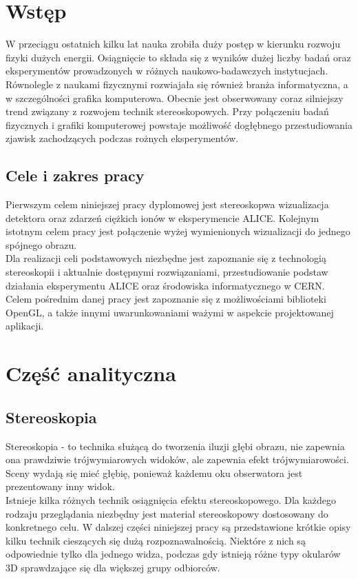 
\graphicspath{{images/}}



\tableofcontents
\thispagestyle{empty}
\thesisstyle
\newpage 

\section[Wstęp]{Wstęp}
W przeciągu ostatnich kilku lat nauka zrobiła duży postęp w kierunku rozwoju fizyki dużych energii. Osiągnięcie to składa się z wyników dużej liczby badań oraz eksperymentów prowadzonych w różnych naukowo-badawczych instytucjach. Równolegle z naukami fizycznymi rozwiajała się również branża informatyczna, a w szczególności grafika komputerowa. Obecnie jest obserwowany coraz silniejszy trend związany z rozwojem technik stereoskopowych. Przy połączeniu badań fizycznych i grafiki komputerowej powstaje możliwość dogłębnego przestudiowania zjawisk zachodzących podczas rożnych eksperymentów.

\subsection{Cele i zakres pracy}
Pierwszym celem niniejszej pracy dyplomowej jest stereoskopwa wizualizacja detektora oraz zdarzeń ciężkich ionów w eksperymencie ALICE. Kolejnym istotnym celem pracy jest połączenie wyżej wymienionych wizualizacji do jednego spójnego obrazu. \\
Dla realizacji celi podstawowych niezbędne jest zapoznanie się z technologią stereoskopii i aktualnie dostępnymi rozwiązaniami, przestudiowanie podstaw działania eksperymentu ALICE oraz środowiska informatycznego w CERN.\\
Celem pośrednim danej pracy jest zapoznanie się z możliwościami biblioteki OpenGL, a także innymi uwarunkowaniami ważymi w aspekcie projektowanej aplikacji.

\newpage
\section[Część analityczna]{Część analityczna}

\subsection{Stereoskopia}
Stereoskopia - to technika służącą do tworzenia iluzji głębi obrazu, nie zapewnia ona prawdziwie trójwymiarowych widoków, ale zapewnia efekt trójwymiarowości. Sceny wydają się mieć głębię, ponieważ każdemu oku obserwatora jest prezentowany inny widok. \\
Istnieje kilka różnych technik osiągnięcia efektu stereoskopowego. Dla każdego rodzaju przeglądania niezbędny jest materiał stereoskopowy dostosowany do konkretnego celu. W dalszej części niniejszej pracy są przedstawione krótkie opisy kilku technik cieszących się dużą rozpoznawalnością. Niektóre z nich są odpowiednie tylko dla jednego widza, podczas gdy istnieją różne typy okularów 3D sprawdzające się dla większej grupy odbiorców.
